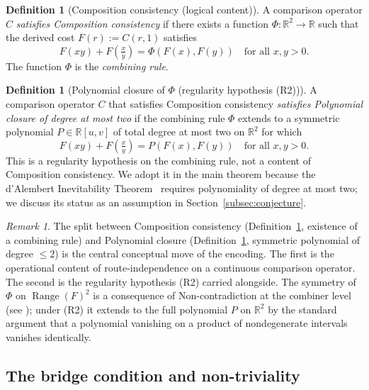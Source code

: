 \documentclass[11pt,a4paper]{article}
\theoremstyle{definition}
\newtheorem{definition}[theorem]{Definition}
\theoremstyle{remark}
\newtheorem{remark}[theorem]{Remark}
\begin{document}
\begin{definition}[Composition consistency (logical content)]
\label{def:composition-consistency}
A comparison operator $C$ \emph{satisfies Composition consistency} if
there exists a function $\Phi : \mathbb{R}^2 \to \mathbb{R}$ such that
the derived cost $F(r) := C(r, 1)$ satisfies
\[
F(xy) + F\!\left(\tfrac{x}{y}\right) = \Phi(F(x), F(y))
\quad \text{for all } x, y > 0.
\]
The function $\Phi$ is the \emph{combining rule}.
\end{definition}

\begin{definition}[Polynomial closure of $\Phi$ (regularity hypothesis (R2))]
\label{def:route-independence}
A comparison operator $C$ that satisfies Composition consistency
\emph{satisfies Polynomial closure of degree at most two} if the
combining rule $\Phi$ extends to a symmetric polynomial $P \in
\mathbb{R}[u, v]$ of total degree at most two on $\mathbb{R}^2$ for which
\[
F(xy) + F\!\left(\tfrac{x}{y}\right) = P(F(x), F(y))
\quad \text{for all } x, y > 0.
\]
This is a regularity hypothesis on the combining rule, not a content of
Composition consistency. We adopt it in the main theorem because the
d'Alembert Inevitability
Theorem~\cite{WashburnZlatanovicAllahyarov2026} requires polynomiality of
degree at most two; we discuss its status as an assumption in
Section~\ref{subsec:conjecture}.
\end{definition}

\begin{remark}
The split between Composition consistency (Definition~\ref{def:composition-consistency},
existence of a combining rule) and Polynomial closure
(Definition~\ref{def:route-independence}, symmetric polynomial of degree
$\leq 2$) is the central conceptual move of the encoding. The first is
the operational content of route-independence on a continuous comparison
operator. The second is the regularity hypothesis (R2) carried alongside.
The symmetry of $\Phi$ on $\operatorname{Range}(F)^2$ is a consequence of
Non-contradiction at the combiner level (see
\cite[Lemma~1]{WashburnZlatanovicAllahyarov2026}); under (R2) it extends
to the full polynomial $P$ on $\mathbb{R}^2$ by the standard argument
that a polynomial vanishing on a product of nondegenerate intervals
vanishes identically.
\end{remark}

\subsection{The bridge condition and non-triviality}
\end{document}
